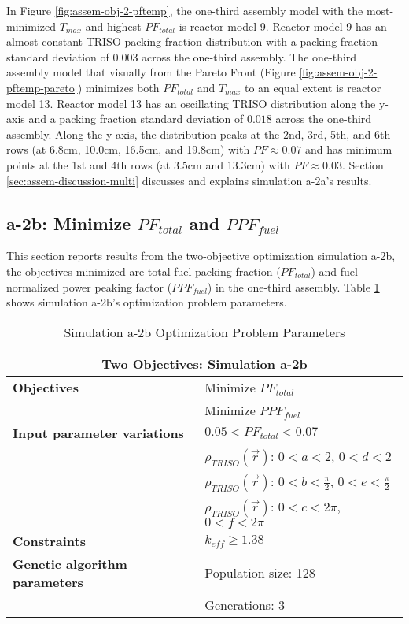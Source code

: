 In Figure \ref{fig:assem-obj-2-pftemp}, the one-third assembly model with the 
most-minimized $T_{max}$ and highest $PF_{total}$ is reactor model 9. 
Reactor model 9 has an almost constant TRISO packing fraction distribution with 
a packing fraction standard deviation of $0.003$ across the one-third assembly. 
The one-third assembly model that visually from the Pareto Front (Figure 
\ref{fig:assem-obj-2-pftemp-pareto}) minimizes both $PF_{total}$ and $T_{max}$ 
to an equal extent is reactor model 13. 
Reactor model 13 has an oscillating TRISO distribution along the y-axis and 
a packing fraction standard deviation of $0.018$ across the one-third assembly. 
Along the y-axis, the distribution peaks at the 2nd, 3rd, 5th, and 6th rows 
(at 6.8cm, 10.0cm, 16.5cm, and 19.8cm) with $PF\approx0.07$ and has minimum points at 
the 1st and 4th rows (at 3.5cm and 13.3cm) with $PF\approx0.03$. 
Section \ref{sec:assem-discussion-multi} discusses and explains simulation a-2a's 
results.

\subsection{a-2b: Minimize $PF_{total}$ and $PPF_{fuel}$}
\label{sec:a-2b}
This section reports results from the two-objective optimization simulation a-2b, the 
objectives minimized are total fuel packing fraction ($PF_{total}$) and fuel-normalized 
power peaking factor ($PPF_{fuel}$) in the one-third assembly.  
Table \ref{tab:simulationa2b} shows simulation a-2b's optimization problem parameters. 
\begin{table}[htbp!]
    \centering
    \onehalfspacing
    \caption{Simulation a-2b Optimization Problem Parameters}
	\label{tab:simulationa2b}
    \footnotesize
    \begin{tabular}{l|p{5.3cm}}
    \hline 
    \multicolumn{2}{c}{\textbf{Two Objectives: Simulation a-2b}} \\
    \hline 
    \textbf{Objectives} & Minimize $PF_{total}$ \\
    & Minimize $PPF_{fuel}$ \\
    \hline 
    \textbf{Input parameter variations} & $0.05<PF_{total}<0.07$ \\
    & $\rho_{TRISO}(\vec{r})$: $0<a<2$, $0<d<2$\\
    & $\rho_{TRISO}(\vec{r})$: $0<b<\frac{\pi}{2}$, $0<e<\frac{\pi}{2}$\\
    & $\rho_{TRISO}(\vec{r})$: $0<c<2\pi$, $0<f<2\pi$\\
    \hline
    \textbf{Constraints} & $k_{eff} \geq 1.38$\\ 
    \hline 
    \textbf{Genetic algorithm parameters} & Population size: 128 \\
    & Generations: 3 \\
    \hline
    \end{tabular}
\end{table}

